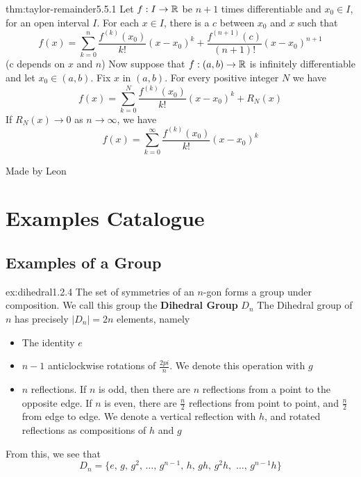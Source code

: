 \documentclass[landscape, 8pt]{extarticle}
\begin{document}
\begin{multicols}{3}
\begin{thm}{thm:taylor-remainder}{5.5.1}
    Let $f:I\to\mathbb{R}$ be $n+1$ times differentiable and $x_{0}\in I$, for an open interval $I$. For each $x \in I$, there is a $c$ between $x_{0}$ and $x$ such that
    \[f(x)=\sum_{k=0}^{n} \frac{f^{(k)}(x_{0})}{k!} (x-x_{0})^k + \frac{f^{(n+1)}(c)}{(n+1)!}(x-x_{0})^{n+1}\]
    (c depends on $x$ and $n$)
    \vspace{0pt}\newline
    Now suppose that $f:(a,b)\to\mathbb{R}$ is infinitely differentiable and let $x_{0}\in (a,b)$. Fix $x$ in $(a,b)$. For every positive integer $N$ we have
    \[f(x)=\sum_{k=0}^{N} \frac{f^{(k)}(x_{0})}{k!}(x-x_{0})^{k} + R_{N}(x)\]
    If $R_{N}(x) \to 0$ as $n\to\infty$, we have
    \[f(x) = \sum_{k=0}^{\infty} \frac{f^{(k)}(x_{0})}{k!}(x-x_{0})^{k}\]
\end{thm}
\vspace{-8pt}
Made by Leon
\newpage




\section{Examples Catalogue}

\subsection*{Examples of a Group}

\begin{xmp}{ex:dihedral}{1.2.4}
The set of symmetries of an $n$-gon forms a group under composition. We call this group the \textbf{Dihedral Group} $D_{n}$
\vspace{0pt}\newline
The Dihedral group of $n$ has precisely $\lvert D_{n} \rvert = 2n$ elements, namely
\renewcommand\labelitemi{\tiny$\bullet$}
\begin{itemize}
    \setlength\itemsep{0em}
    \item The identity $e$
    \item $n- 1$ anticlockwise rotations of $\frac{2pi}{n}$. We denote this operation with $g$
    \item $n$ reflections. If $n$ is odd, then there are $n$ reflections from a point to the opposite edge. If $n$ is even, there are $\frac{n}{2}$ reflections from point to point, and $\frac{n}{2}$ from edge to edge. We denote a vertical reflection with $h$, and rotated reflections as compositions of $h$ and $g$ 
\end{itemize}
From this, we see that
\[D_{n} = \{e,\,g,\,g^{2},\,\dots,\,g^{n-1},\, h,\, gh,\, g^{2}h,\,\,\dots,\, g^{n-1}h \}\]
\end{xmp}
\vspace{-5pt}


\end{multicols}
\end{document}
